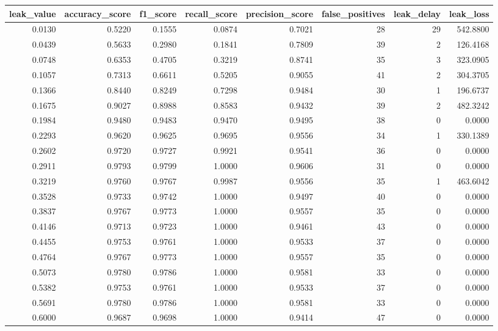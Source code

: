 \begin{tabular}{rrrrrrrr}
\toprule
leak\_value & accuracy\_score & f1\_score & recall\_score & precision\_score & false\_positives & leak\_delay & leak\_loss \\
\midrule
0.0130 & 0.5220 & 0.1555 & 0.0874 & 0.7021 & 28 & 29 & 542.8800 \\
0.0439 & 0.5633 & 0.2980 & 0.1841 & 0.7809 & 39 & 2 & 126.4168 \\
0.0748 & 0.6353 & 0.4705 & 0.3219 & 0.8741 & 35 & 3 & 323.0905 \\
0.1057 & 0.7313 & 0.6611 & 0.5205 & 0.9055 & 41 & 2 & 304.3705 \\
0.1366 & 0.8440 & 0.8249 & 0.7298 & 0.9484 & 30 & 1 & 196.6737 \\
0.1675 & 0.9027 & 0.8988 & 0.8583 & 0.9432 & 39 & 2 & 482.3242 \\
0.1984 & 0.9480 & 0.9483 & 0.9470 & 0.9495 & 38 & 0 & 0.0000 \\
0.2293 & 0.9620 & 0.9625 & 0.9695 & 0.9556 & 34 & 1 & 330.1389 \\
0.2602 & 0.9720 & 0.9727 & 0.9921 & 0.9541 & 36 & 0 & 0.0000 \\
0.2911 & 0.9793 & 0.9799 & 1.0000 & 0.9606 & 31 & 0 & 0.0000 \\
0.3219 & 0.9760 & 0.9767 & 0.9987 & 0.9556 & 35 & 1 & 463.6042 \\
0.3528 & 0.9733 & 0.9742 & 1.0000 & 0.9497 & 40 & 0 & 0.0000 \\
0.3837 & 0.9767 & 0.9773 & 1.0000 & 0.9557 & 35 & 0 & 0.0000 \\
0.4146 & 0.9713 & 0.9723 & 1.0000 & 0.9461 & 43 & 0 & 0.0000 \\
0.4455 & 0.9753 & 0.9761 & 1.0000 & 0.9533 & 37 & 0 & 0.0000 \\
0.4764 & 0.9767 & 0.9773 & 1.0000 & 0.9557 & 35 & 0 & 0.0000 \\
0.5073 & 0.9780 & 0.9786 & 1.0000 & 0.9581 & 33 & 0 & 0.0000 \\
0.5382 & 0.9753 & 0.9761 & 1.0000 & 0.9533 & 37 & 0 & 0.0000 \\
0.5691 & 0.9780 & 0.9786 & 1.0000 & 0.9581 & 33 & 0 & 0.0000 \\
0.6000 & 0.9687 & 0.9698 & 1.0000 & 0.9414 & 47 & 0 & 0.0000 \\
\bottomrule
\end{tabular}
